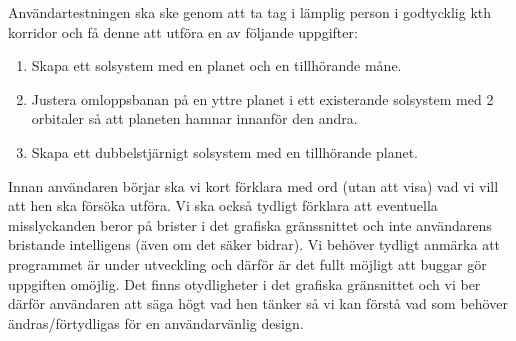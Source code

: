 
Användartestningen ska ske genom att ta tag i lämplig person
i godtycklig kth korridor och få denne att utföra en av följande uppgifter:
\begin{enumerate}
    \item Skapa ett solsystem med en planet och en tillhörande måne.
    \item Justera omloppsbanan på en yttre planet i ett existerande
        solsystem med 2 orbitaler så att planeten hamnar innanför den andra.
    \item Skapa ett dubbelstjärnigt solsystem med en tillhörande planet.
\end{enumerate}

Innan användaren börjar ska vi kort förklara med ord (utan att visa)
vad vi vill att hen ska försöka utföra.
Vi ska också tydligt förklara att eventuella misslyckanden
beror på brister i det grafiska gränssnittet och
inte användarens bristande intelligens (även om det säker bidrar).
Vi behöver tydligt anmärka att programmet är under utveckling och
därför är det fullt möjligt att buggar gör uppgiften omöjlig.
Det finns otydligheter i det grafiska gränsnittet och vi ber därför
användaren att säga högt vad hen tänker så vi kan förstå vad som
behöver ändras/förtydligas för en användarvänlig design.

